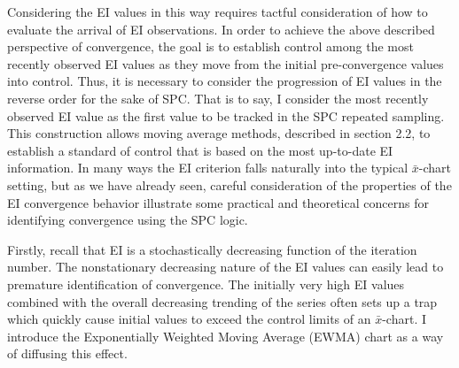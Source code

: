 \documentclass[12pt]{article}
\begin{document}
	
	Considering the EI values in this way requires tactful consideration of how to evaluate the arrival of EI observations.
	In order to achieve the above described perspective of convergence, the goal is to establish control among the most recently observed EI values as they move from the initial pre-convergence values into control.
	Thus, it is necessary to consider the progression of EI values in the reverse order for the sake of SPC. %
	That is to say, I consider the most recently observed EI value as the first value to be tracked in the SPC repeated sampling.
	This construction allows moving average methods, described in section 2.2, to establish a standard of control that is based on the most up-to-date EI information. 
	In many ways the EI criterion falls naturally into the typical $\bar x$-chart setting, but as we have already seen, careful consideration of the properties of the EI convergence behavior illustrate some practical and theoretical concerns for identifying convergence using the SPC logic.
	
	
	Firstly, recall that EI is a stochastically decreasing function of the iteration number. 
	The nonstationary decreasing nature of the EI values can easily lead to premature identification of convergence.
	The initially very high EI values combined with the overall decreasing trending of the series often sets up a trap which quickly cause initial values to exceed the control limits of an $\bar x$-chart. 
	I introduce the Exponentially Weighted Moving Average (EWMA) chart as a way of diffusing this effect. 
	
\end{document}
